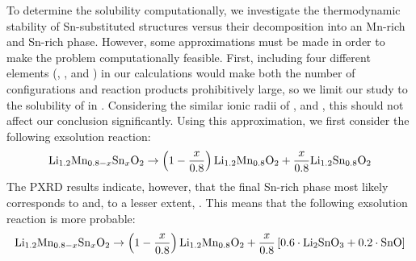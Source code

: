 \begin{refsection}
To determine the  solubility computationally, we investigate the 
thermodynamic stability of Sn-substituted structures versus their 
decomposition into an Mn-rich and Sn-rich phase. However, some approximations 
must be made in order to make the problem computationally feasible. First, 
including four different elements (, ,  and ) in 
our calculations would make both the number of configurations and reaction 
products prohibitively large, so we limit our study to the solubility of 
 in . Considering the similar ionic radii of 
,  and , this should not affect our 
conclusion significantly. Using this approximation, we first consider the 
following exsolution reaction: 
\begin{equation} 
 \ce{Li_{1.2}Mn_{0.8-x}Sn_xO2} \rightarrow  \left( 1 - \frac{x}{0.8} \right) 
\ce{Li_{1.2}Mn_{0.8}O2} +  \frac{x}{0.8} \ce{Li_{1.2}Sn_{0.8}O2}  
\end{equation} 
The PXRD results indicate, however, that the final Sn-rich phase most likely 
corresponds to  and, to a lesser extent, . This means that 
the following exsolution reaction is more probable: 
\begin{equation} \label{batteries:eq-exsolution} 
 \ce{Li_{1.2}Mn_{0.8-x}Sn_xO2} \rightarrow  \left( 1 - \frac{x}{0.8} \right) 
\ce{Li_{1.2}Mn_{0.8}O2} +  \frac{x}{0.8} \left[  0.6 \cdot \ce{Li2SnO3} + 0.2 
\cdot \ce{SnO} \right] 
\end{equation} 
 

\end{refsection}
